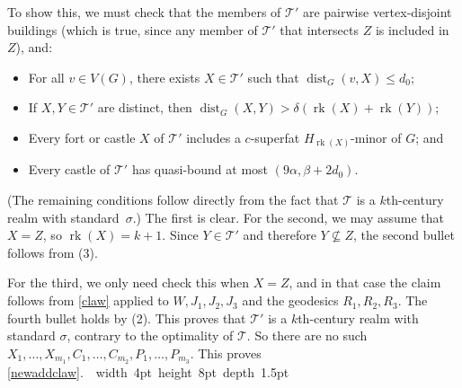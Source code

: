 \documentclass[titlepage,11pt]{article}
\newcommand\blackslug{\hbox{\hskip 1pt \vrule width 4pt height 8pt depth 1.5pt
		\hskip 1pt}}
\newcommand\bbox{\hfill \quad \blackslug \bigbreak}
\def\LL{,\ldots,}
\newcommand{\dist}{\operatorname{dist}}
\newcommand{\rk}{\operatorname{rk}}
\newcommand{\mac}{\mathcal}
\begin{document}
	To show this, we must check that
	the members of $\mathcal{T}'$ are pairwise vertex-disjoint buildings (which is true, since any member of $\mac T'$ that intersects $Z$ is included in $Z$), and:
	\begin{itemize}
		\item For all $v\in V(G)$, there exists $X\in \mathcal{T}'$ such that $\dist_G(v,X)\le d_0$;
		\item If $X,Y\in \mac T'$ are distinct, then $\dist_G(X,Y)>\delta(\rk(X)+\rk(Y))$;
		\item Every fort or castle $X$ of $\mac T'$ includes a $c$-superfat $H_{\rk(X)}$-minor of $G$; and
		\item Every castle of $\mac T'$ has quasi-bound at most $(9\alpha, \beta+2d_0)$.
	\end{itemize}
	(The remaining conditions follow directly from the fact that $\mac T$ is a $k$th-century realm with standard~$\sigma$.)
	The first is clear. For the second, we may assume that $X=Z$, so $\rk(X)=k+1$. Since $Y\in \mac T'$ and therefore 
	$Y\not\subseteq Z$, the second bullet follows from (3).
	
	For the third, we only need check this when $X=Z$, and in that case the claim follows from \ref{claw} applied to $W, J_1,J_2,J_3$ and the geodesics $R_1,R_2,R_3$.
	The fourth bullet holds by (2). 
	This proves that $\mac T'$ is a $k$th-century realm with standard $\sigma$,
	contrary to the optimality of $\mac T$. 
	So there are no such
	$X_1\LL X_{m_1}, C_1\LL C_{m_2},P_1\LL P_{m_3}$. This proves \ref{newaddclaw}.~\bbox
	
\end{document}
